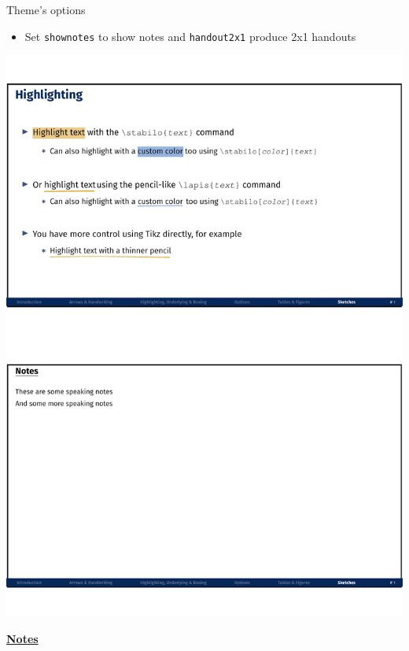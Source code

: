 \documentclass[10pt]{beamer}
\begin{document}
\begin{frame}
    {Theme's options}
    \begin{itemize}
        \item Set \texttt{shownotes} to show notes and \texttt{handout2x1} produce 2x1 handouts
    \end{itemize}
    \begin{center}
        \begin{minipage}[b]{.3\textwidth}
            \includegraphics[width=\textwidth]{shownotes_handout}
        \end{minipage}
    \end{center}
\end{frame}
\begin{flushleft}
    \underline{\textbf{Notes}}\setlength{\parskip}{.15cm}\notesize\newline\par
\end{flushleft}
\end{document}

